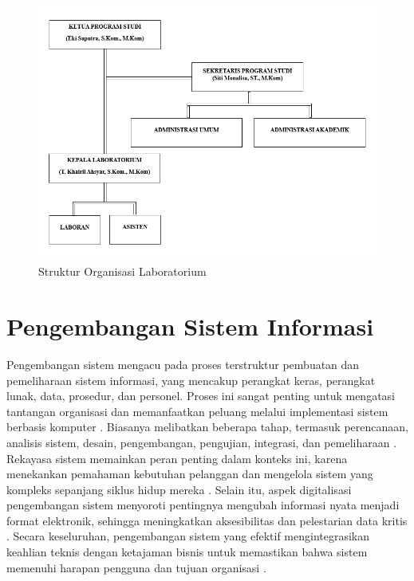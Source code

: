 \begin{figure}
	\centering
	\includegraphics[width=0.82\linewidth]{konten/gambar/Struktur Organisasi.png}
	\caption{Struktur Organisasi Laboratorium \protect\cite{labsi2023}}
	\label{fig:struktur-organisasi}
\end{figure}


\section{Pengembangan Sistem Informasi}
Pengembangan sistem mengacu pada proses terstruktur pembuatan dan pemeliharaan sistem informasi, yang mencakup perangkat keras, perangkat lunak, data, prosedur, dan personel. Proses ini sangat penting untuk mengatasi tantangan organisasi dan memanfaatkan peluang melalui implementasi sistem berbasis komputer \cite{efendi2023perkembangan}. Biasanya melibatkan beberapa tahap, termasuk perencanaan, analisis sistem, desain, pengembangan, pengujian, integrasi, dan pemeliharaan \cite{kiplie2018system}. Rekayasa sistem memainkan peran penting dalam konteks ini, karena menekankan pemahaman kebutuhan pelanggan dan mengelola sistem yang kompleks sepanjang siklus hidup mereka \cite{furterer2018applying}. Selain itu, aspek digitalisasi pengembangan sistem menyoroti pentingnya mengubah informasi nyata menjadi format elektronik, sehingga meningkatkan aksesibilitas dan pelestarian data kritis \cite{kiplie2018system}. Secara keseluruhan, pengembangan sistem yang efektif mengintegrasikan keahlian teknis dengan ketajaman bisnis untuk memastikan bahwa sistem memenuhi harapan pengguna dan tujuan organisasi \cite{ahmed2014developing}.

